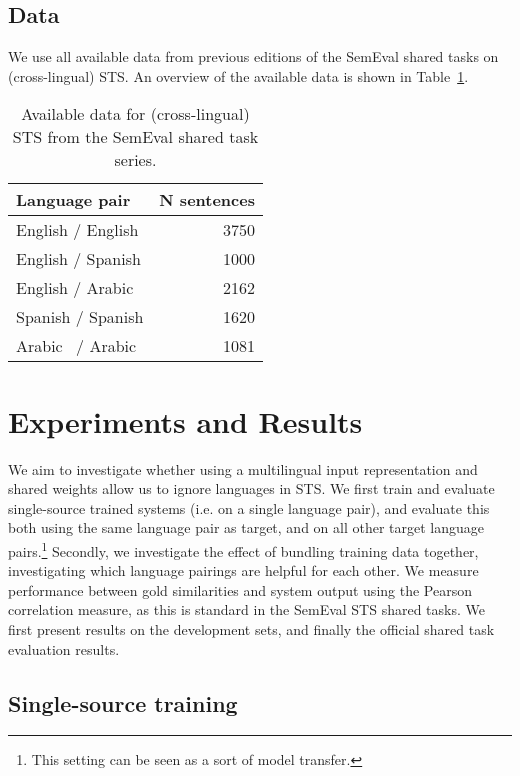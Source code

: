 \documentclass[11pt,a4paper]{article}
\begin{document}
\subsection{Data}

We use all available data from previous editions of the SemEval shared tasks on (cross-lingual) STS.
An overview of the available data is shown in Table~\ref{tab:data}.

\begin{table}[h]
    \centering
    \begin{tabular}{lr}
        \toprule
        \textbf{Language pair} & \textbf{N sentences} \\
        \midrule
        English / English   & 3750 \\
        English / Spanish   & 1000 \\
        English / Arabic    & 2162 \\
        Spanish / Spanish   & 1620 \\
        Arabic \ / Arabic   & 1081 \\
        \bottomrule
    \end{tabular}
    \caption{Available data for (cross-lingual) STS from the SemEval shared task series.\vspace{2pt}}
    \label{tab:data}
\end{table}


\section{Experiments and Results}

We aim to investigate whether using a multilingual input representation and shared weights allow us to ignore languages in STS.
We first train and evaluate single-source trained systems (i.e. on a single language pair), and evaluate this both using the same language pair as target, and on all other target language pairs.\footnote{This setting can be seen as a sort of model transfer.}
Secondly, we investigate the effect of bundling training data together, investigating which language pairings are helpful for each other.
We measure performance between gold similarities and system output using the Pearson correlation measure, as this is standard in the SemEval STS shared tasks.
We first present results on the development sets, and finally the official shared task evaluation results.

\subsection{Single-source training}
\end{document}
